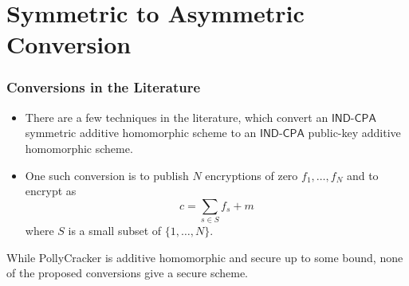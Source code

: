 \documentclass[10pt]{beamer}
\newcommand{\IND}{\mathsf{IND}}
\newcommand{\CPA}{\mathsf{CPA}}
\begin{document}
\section{Symmetric to Asymmetric Conversion}

\begin{frame}
\frametitle{Conversions in the Literature}

\begin{itemize}
 \item There are a few techniques in the literature, which convert an $\IND\mbox{-}\CPA$ symmetric additive homomorphic scheme to an $\IND\mbox{-}\CPA$ public-key additive homomorphic scheme.
 \item One such conversion is to publish $N$ encryptions of zero $f_1,\dots,f_N$ and to encrypt as $$c = \sum_{s \in S} f_s + m$$ where $S$ is a small subset of $\{1,\dots,N\}$.
 \end{itemize}

\vspace{1em}
\begin{block}{}
While PollyCracker is additive homomorphic and secure up to some bound, none of the proposed conversions give a secure scheme.
\end{block}
\end{frame}
\end{document}
